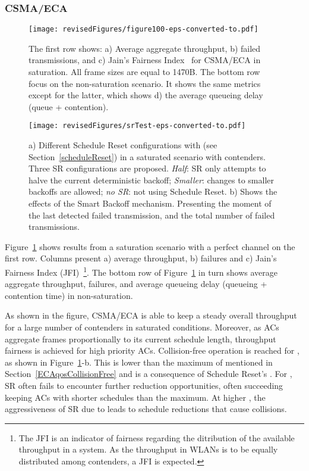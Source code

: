 \documentclass[a4paper]{article}
\begin{document}
\subsubsection{CSMA/ECA}

	\begin{figure}[t]
	\centering
		\texttt{[image: revisedFigures/figure100-eps-converted-to.pdf]}
		\caption{The first row shows: a) Average aggregate throughput, b) failed transmissions, and c) Jain's Fairness Index~\cite{JFI} for CSMA/ECA in saturation. All frame sizes are equal to 1470B. The bottom row focus on the non-saturation scenario. It shows the same metrics except for the latter, which shows d) the average queueing delay (queue + contention).}
		\label{fig:100}
	\end{figure}

	\begin{figure}[t]
	\centering
		\texttt{[image: revisedFigures/srTest-eps-converted-to.pdf]}
		\caption{a) Different Schedule Reset configurations with  (see Section~\ref{scheduleReset}) in a saturated scenario with  contenders. Three SR configurations are proposed. \emph{Half}: SR only attempts to halve the current deterministic backoff; \emph{Smaller}: changes to smaller backoffs are allowed; \emph{no SR}: not using Schedule Reset. b) Shows the effects of the Smart Backoff mechanism. Presenting the moment of the last detected failed transmission, and the total number of failed transmissions.}
		\label{srTest}
	\end{figure}

Figure~\ref{fig:100} shows results from a saturation scenario with a perfect channel on the first row. Columns present a) average throughput, b) failures and c) Jain's Fairness Index (JFI)~\cite{JFI}\footnote{The JFI is an indicator of fairness regarding the ditribution of the available throughput in a system. As the throughput in WLANs is to be equally distributed among contenders, a JFI is expected.}. The bottom row of Figure~\ref{fig:100} in turn shows average aggregate throughput, failures, and average queueing delay (queueing + contention time) in non-saturation.

As shown in the figure, CSMA/ECA is able to keep a steady overall throughput for a large number of contenders in saturated conditions. Moreover, as ACs aggregate frames proportionally to its current schedule length, throughput fairness is achieved for high priority ACs. Collision-free operation is reached for , as shown in Figure~\ref{fig:100}-b. This is lower than the maximum of  mentioned in Section~\ref{ECAqosCollisionFree} and is a consequence of Schedule Reset's . For , SR often fails to encounter further reduction opportunities, often succeeding keeping ACs with shorter schedules than the maximum. At higher , the aggressiveness of SR due to  leads to schedule reductions that cause collisions.
\end{document}
